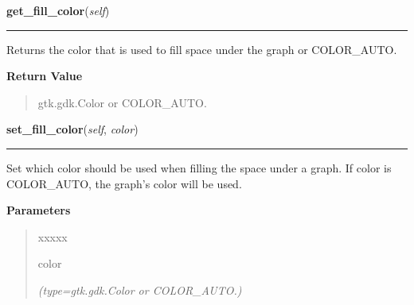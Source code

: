     \label{pygtk_chart:line_chart:Graph:get_fill_color}

    \vspace{0.5ex}

\hspace{.8\funcindent}\begin{boxedminipage}{\funcwidth}

    \raggedright \textbf{get\_fill\_color}(\textit{self})

    \vspace{-1.5ex}

    \rule{\textwidth}{0.5\fboxrule}
\setlength{\parskip}{2ex}
    Returns the color that is used to fill space under the graph or 
    COLOR\_AUTO.

\setlength{\parskip}{1ex}
      \textbf{Return Value}
    \vspace{-1ex}

      \begin{quote}
      gtk.gdk.Color or COLOR\_AUTO.

      \end{quote}

    \end{boxedminipage}

    \label{pygtk_chart:line_chart:Graph:set_fill_color}

    \vspace{0.5ex}

\hspace{.8\funcindent}\begin{boxedminipage}{\funcwidth}

    \raggedright \textbf{set\_fill\_color}(\textit{self}, \textit{color})

    \vspace{-1.5ex}

    \rule{\textwidth}{0.5\fboxrule}
\setlength{\parskip}{2ex}
    Set which color should be used when filling the space under a graph. If
    color is COLOR\_AUTO, the graph's color will be used.

\setlength{\parskip}{1ex}
      \textbf{Parameters}
      \vspace{-1ex}

      \begin{quote}
        \begin{Ventry}{xxxxx}

          \item[color]

            {\it (type=gtk.gdk.Color or COLOR\_AUTO.)}

        \end{Ventry}

      \end{quote}

    \end{boxedminipage}

